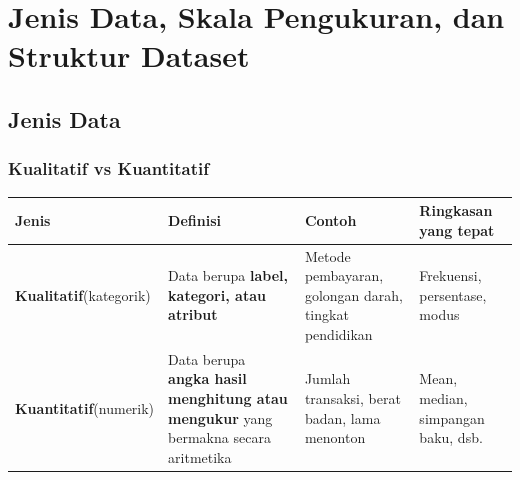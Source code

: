 \documentclass[
  indonesian,
  letterpaper,
]{book}
\newcounter{none} %
\begin{document}

\chapter{Jenis Data, Skala Pengukuran, dan Struktur
Dataset}\label{jenis-data-skala-pengukuran-dan-struktur-dataset}

\section{Jenis Data}\label{jenis-data}

\subsection{Kualitatif vs Kuantitatif}\label{kualitatif-vs-kuantitatif}

{\def\LTcaptype{none} %
\begin{longtable}[]{@{}
  >{\raggedright\arraybackslash}p{}
  >{\raggedright\arraybackslash}p{}
  >{\raggedright\arraybackslash}p{}
  >{\raggedright\arraybackslash}p{}@{}}
\toprule\noalign{}
\begin{minipage}[b]{\linewidth}\raggedright
Jenis
\end{minipage} & \begin{minipage}[b]{\linewidth}\raggedright
Definisi
\end{minipage} & \begin{minipage}[b]{\linewidth}\raggedright
Contoh
\end{minipage} & \begin{minipage}[b]{\linewidth}\raggedright
Ringkasan yang tepat
\end{minipage} \\
\midrule\noalign{}
\endhead
\bottomrule\noalign{}
\endlastfoot
\textbf{Kualitatif}(kategorik) & Data berupa \textbf{label, kategori,
atau atribut} & Metode pembayaran, golongan darah, tingkat pendidikan &
Frekuensi, persentase, modus \\
\textbf{Kuantitatif}(numerik) & Data berupa \textbf{angka hasil
menghitung atau mengukur} yang bermakna secara aritmetika & Jumlah
transaksi, berat badan, lama menonton & Mean, median, simpangan baku,
dsb. \\
\end{longtable}
}
\end{document}
